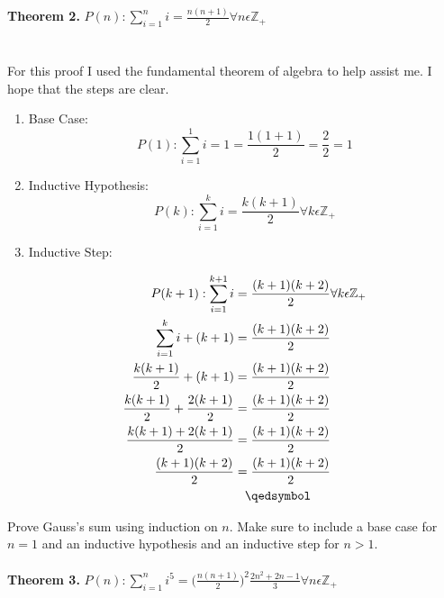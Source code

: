 \documentclass[12pt]{article}
\begin{document}
\noindent \textbf{Theorem 2.}
\begin{math}P(n):\sum\limits_{i = 1}^{n} i = \frac{n(n + 1)}{2} \forall n \epsilon \mathbb{Z}_+  \end{math}\\
\\\\For this proof I used the fundamental theorem of algebra to help assist me. I hope that the steps are clear.\\
\begin{enumerate}
\item Base Case:\\
\[P(1):\sum\limits_{i = 1}^{1} i = 1  = \frac{1(1+1)}{2} = \frac{2}{2} = 1\]
\item Inductive Hypothesis:
\[P(k):\sum\limits_{i = 1}^{k} i = \frac{k(k + 1)}{2} \forall k \epsilon \mathbb{Z}_+\]
\item Inductive Step:

\begin{align*}
P(k+1):\sum\limits_{i = 1}^{k+1} i &= \frac{(k + 1)(k+2)}{2} \forall k \epsilon \mathbb{Z}_+\\
\sum\limits_{i = 1}^{k} i + (k + 1)&= \frac{(k + 1)(k+2)}{2}\\
\frac{k(k+1)}{2} + (k+1)&= \frac{(k + 1)(k+2)}{2}\\
\frac{k(k+1)}{2} + \frac{2(k+1)}{2}&= \frac{(k + 1)(k+2)}{2}\\
\frac{k(k+1)+ 2(k+1)}{2}&= \frac{(k + 1)(k+2)}{2}\\
\frac{(k + 1)(k+2)}{2}&= \frac{(k + 1)(k+2)}{2}\\
&\hspace{0.3cm}\qedsymbol
\end{align*}
\end{enumerate}
\noindent Prove Gauss’s sum using induction on \begin{math}n\end{math}. Make sure to include a base case for \begin{math} n = 1\end{math} and an inductive hypothesis and an inductive step for \begin{math}n > 1\end{math}.\\\\
\noindent \textbf{Theorem 3.}
\begin{math}P(n):\sum\limits_{i = 1}^{n} i^5 = \big(\frac{n(n + 1)}{2}\big)^2\frac{2n^2+2n-1}{3} \forall n \epsilon \mathbb{Z}_+  \end{math}
\end{document}
